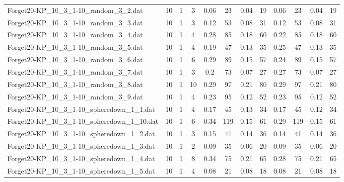 \begin{sidewaystable}[!ht]
{\begin{tabular}{lccccccccccc}
Forget20-KP\_10\_3\_1-10\_random\_3\_2.dat & 10 & 1 & 3 & 0.06 & 23 &  \textcolor{blue2}{0.04} & 19 & 0.06 & 23 &  \textcolor{blue2}{0.04} & 19 \\
Forget20-KP\_10\_3\_1-10\_random\_3\_3.dat & 10 & 1 & 3 & 0.12 & 53 &  \textcolor{blue2}{0.08} & 31 & 0.12 & 53 &  \textcolor{blue2}{0.08} & 31 \\
Forget20-KP\_10\_3\_1-10\_random\_3\_4.dat & 10 & 1 & 4 & 0.28 & 85 &  \textcolor{blue2}{0.18} & 60 & 0.22 & 85 &  \textcolor{blue2}{0.18} & 60 \\
Forget20-KP\_10\_3\_1-10\_random\_3\_5.dat & 10 & 1 & 4 & 0.19 & 47 &  \textcolor{blue2}{0.13} & 35 & 0.25 & 47 &  \textcolor{blue2}{0.13} & 35 \\
Forget20-KP\_10\_3\_1-10\_random\_3\_6.dat & 10 & 1 & 6 & 0.29 & 89 &  \textcolor{blue2}{0.15} & 57 & 0.24 & 89 &  \textcolor{blue2}{0.15} & 57 \\
Forget20-KP\_10\_3\_1-10\_random\_3\_7.dat & 10 & 1 & 3 & 0.2 & 73 &  \textcolor{blue2}{0.07} & 27 & 0.27 & 73 &  \textcolor{blue2}{0.07} & 27 \\
Forget20-KP\_10\_3\_1-10\_random\_3\_8.dat & 10 & 1 & 10 & 0.29 & 97 &  \textcolor{blue2}{0.21} & 80 & 0.29 & 97 &  \textcolor{blue2}{0.21} & 80 \\
Forget20-KP\_10\_3\_1-10\_random\_3\_9.dat & 10 & 1 & 4 & 0.23 & 95 &  \textcolor{blue2}{0.12} & 52 & 0.23 & 95 &  \textcolor{blue2}{0.12} & 52 \\
Forget20-KP\_10\_3\_1-10\_spheredown\_1\_1.dat & 10 & 1 & 4 & 0.17 & 45 & 0.13 & 34 & 0.17 & 45 &  \textcolor{blue2}{0.12} & 34 \\
Forget20-KP\_10\_3\_1-10\_spheredown\_1\_10.dat & 10 & 1 & 6 & 0.34 & 119 &  \textcolor{blue2}{0.15} & 61 & 0.29 & 119 &  \textcolor{blue2}{0.15} & 61 \\
Forget20-KP\_10\_3\_1-10\_spheredown\_1\_2.dat & 10 & 1 & 3 & 0.15 & 41 &  \textcolor{blue2}{0.14} & 36 &  \textcolor{blue2}{0.14} & 41 &  \textcolor{blue2}{0.14} & 36 \\
Forget20-KP\_10\_3\_1-10\_spheredown\_1\_3.dat & 10 & 1 & 2 & 0.09 & 35 &  \textcolor{blue2}{0.06} & 20 & 0.09 & 35 &  \textcolor{blue2}{0.06} & 20 \\
Forget20-KP\_10\_3\_1-10\_spheredown\_1\_4.dat & 10 & 1 & 8 & 0.34 & 75 &  \textcolor{blue2}{0.21} & 65 & 0.28 & 75 &  \textcolor{blue2}{0.21} & 65 \\
Forget20-KP\_10\_3\_1-10\_spheredown\_1\_5.dat & 10 & 1 & 4 &  \textcolor{blue2}{0.08} & 21 &  \textcolor{blue2}{0.08} & 18 &  \textcolor{blue2}{0.08} & 21 &  \textcolor{blue2}{0.08} & 18 \\

\end{tabular}}
\end{sidewaystable}
